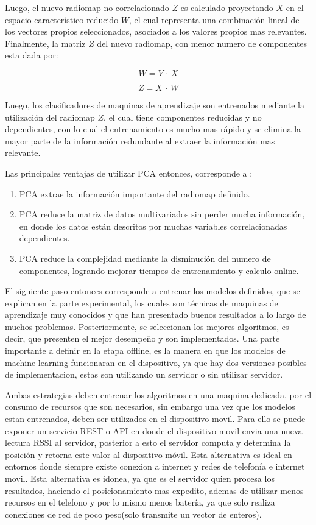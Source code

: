 Luego, el nuevo radiomap no correlacionado $Z$ es calculado proyectando $X$ en el espacio característico reducido $W$, el cual representa una combinación lineal de los vectores propios seleccionados, asociados a los valores propios mas relevantes. Finalmente, la matriz $Z$ del nuevo radiomap, con menor numero de componentes esta dada por:

$$ W = V \, \cdot \, X$$

$$ Z = X  \, \cdot \, W $$

Luego, los clasificadores de maquinas de aprendizaje son entrenados mediante la utilización del radiomap $Z$, el cual tiene componentes reducidas y no dependientes, con lo cual el entrenamiento es mucho mas rápido y se elimina la mayor parte de la información redundante al extraer la información mas relevante.

Las principales ventajas de utilizar PCA entonces, corresponde a \citep{7743586}:

\begin{enumerate}
\item PCA extrae la información importante del radiomap definido.

\item PCA reduce la matriz de datos multivariados sin perder mucha información, en donde los datos están descritos por muchas variables correlacionadas dependientes.

\item PCA reduce la complejidad mediante la disminución del numero de componentes, logrando mejorar tiempos de entrenamiento y calculo online.
\end{enumerate}


El siguiente paso entonces corresponde a entrenar los modelos definidos, que se explican en la parte experimental, los cuales son técnicas de maquinas de aprendizaje muy conocidos y que han presentado buenos resultados a lo largo de muchos problemas. Posteriormente, se seleccionan los mejores algoritmos, es decir, que presenten el mejor desempeño y son implementados. Una parte importante a definir en la etapa offline, es la manera en que los modelos de machine learning funcionaran en el dispositivo, ya que hay dos versiones posibles de implementacion, estas son utilizando un servidor o sin utilizar servidor. 

Ambas estrategias deben entrenar los algoritmos en una maquina dedicada, por el consumo de recursos que son necesarios, sin embargo una vez que los modelos estan entrenados, deben ser utilizados en el dispositivo movil. Para ello se puede exponer un servicio REST o API en donde el dispositivo movil envia una nueva lectura RSSI al servidor, posterior a esto el servidor computa y determina la posición y retorna este valor al dispositivo móvil. Esta alternativa es ideal en entornos donde siempre existe conexion a internet y redes de telefonía e internet movil. Esta alternativa es idonea, ya que es el servidor quien procesa los resultados, haciendo el posicionamiento mas expedito, ademas de utilizar menos recursos en el telefono y por lo mismo menos batería, ya que solo realiza conexiones de red de poco peso(solo transmite un vector de enteros).

